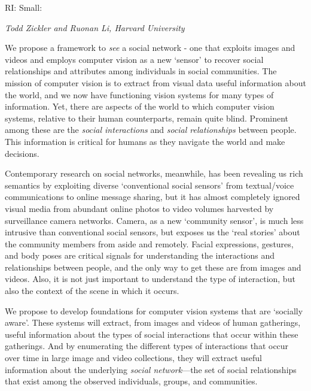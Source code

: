 \pagestyle{empty}

\noindent\textsf{RI: Small:}\vspace{0.9ex}\\

\vspace{1.3ex}
\noindent \textsf{\large \em Todd Zickler and Ruonan Li, Harvard University}
\vspace{2.5ex}

\noindent We propose a framework to \emph{see} a social network - one that exploits images and videos and employs computer vision as a new `sensor' to recover social relationships and attributes among individuals in social communities. The mission of computer vision is to extract from visual data useful information about the world, and we now have functioning vision systems for many types of information. Yet, there are aspects of the world to which computer vision systems, relative to their human counterparts, remain quite blind. Prominent among these are the \emph{social interactions} and \emph{social relationships} between people. This information is critical for humans as they navigate the world and make decisions.

Contemporary research on social networks, meanwhile, has been revealing us rich semantics by exploiting diverse `conventional social sensors' from textual/voice communications to online message sharing, but it has almost completely ignored visual media from abundant online photos to video volumes harvested by surveillance camera networks. Camera, as a new `community sensor', is much less intrusive than conventional social sensors, but exposes us the `real stories' about the community members from aside and remotely. Facial expressions, gestures, and body poses are critical signals for understanding the interactions and relationships between people, and the only way to get these are from images and videos. Also, it is not just important to understand the type of interaction, but also the context of the scene in which it occurs.

We propose to develop foundations for computer vision systems that are `socially aware'. These systems will extract, from images and videos of human gatherings, useful information about the types of social interactions that occur within these gatherings. And by enumerating the different types of interactions that occur over time in large image and video collections, they will extract useful information about the underlying \emph{social network}---the set of social relationships that exist among the observed individuals, groups, and communities. 

